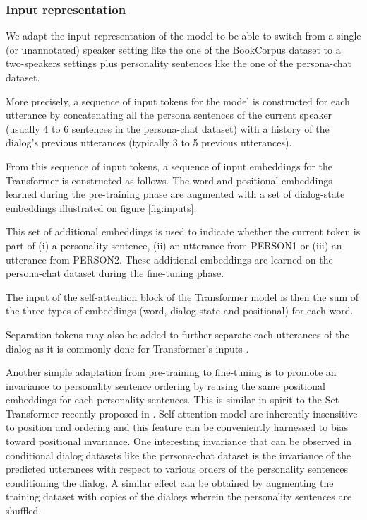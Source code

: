 \documentclass[letterpaper]{article} \usepackage{aaai19}  \usepackage{times}  \usepackage{helvet}  \usepackage{courier}  \usepackage{url}  \usepackage{graphicx}  \usepackage{natbib}
\begin{document}
\subsubsection{Input representation}
We adapt the input representation of the model to be able to switch from a single (or unannotated) speaker setting like the one of the BookCorpus dataset to a two-speakers settings plus personality sentences like the one of the {\sc persona-chat} dataset.

More precisely, a sequence of input tokens for the model is constructed for each utterance by concatenating all the persona sentences of the current speaker (usually 4 to 6 sentences in the {\sc persona-chat} dataset) with a history of the dialog's previous utterances (typically 3 to 5 previous utterances).

From this sequence of input tokens, a sequence of input embeddings for the Transformer is constructed as follows. The word and positional embeddings learned during the pre-training phase are augmented with a set of dialog-state embeddings illustrated on figure \ref{fig:inputs}.

This set of additional embeddings is used to indicate whether the current token is part of (i) a personality sentence, (ii) an utterance from PERSON1 or (iii) an utterance from PERSON2.
These additional embeddings are learned on the {\sc persona-chat} dataset during the fine-tuning phase.

The input of the self-attention block of the Transformer model is then the sum of the three types of embeddings (word, dialog-state and positional) for each word.

Separation tokens may also be added to further separate each utterances of the dialog as it is commonly done for Transformer's inputs \citep{radford_improving_2018,devlin_bert:_2018}.

Another simple adaptation from pre-training to fine-tuning is to promote an invariance to personality sentence ordering by reusing the same positional embeddings for each personality sentences. This is similar in spirit to the Set Transformer recently proposed in \citeauthor{lee_set_2018}. Self-attention model are inherently insensitive to position and ordering and this feature can be conveniently harnessed to bias toward positional invariance. One interesting invariance that can be observed in conditional dialog datasets like the {\sc persona-chat} dataset is the invariance of the predicted utterances with respect to various orders of the personality sentences conditioning the dialog. A similar effect can be obtained by augmenting the training dataset with copies of the dialogs wherein the personality sentences are shuffled.
\end{document}
